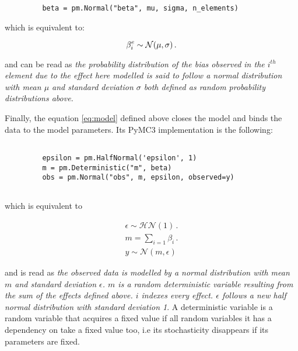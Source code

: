 \begin{verbatim}
         beta = pm.Normal("beta", mu, sigma, n_elements)  
\end{verbatim}

which is equivalent to:

\begin{equation}
\beta^e_i \sim \mathcal{N}(\mu, \sigma)\,.  \\
\end{equation}

and can be read as \textit{the probability distribution of the bias observed in the $i^{th}$ element due to the effect here modelled is said to follow a normal distribution with mean $\mu$ and standard deviation $\sigma$ both defined as random probability distributions above.}

Finally, the equation \ref{eq:model} defined above closes the model and binds the data to the model parameters. Its PyMC3 implementation is the following:

\begin{verbatim}
               
         epsilon = pm.HalfNormal('epsilon', 1)                
         m = pm.Deterministic("m", beta)
         obs = pm.Normal("obs", m, epsilon, observed=y)
      
\end{verbatim}

which is equivalent to

\begin{align}
\nonumber \epsilon \sim \mathcal{HN}(1) \,. \\ 
m = \sum_{i=1} \beta_i \,. \\ 
\nonumber y \sim \mathcal{N}(m, \epsilon)
\end{align}

and is read as \textit{the observed data is modelled by a normal distribution with mean $m$ and standard deviation $\epsilon$. $m$ is a random deterministic variable resulting from the sum of the effects defined above. $i$ indexes every effect. $\epsilon$ follows a new half normal distribution with standard deviation 1}. A deterministic variable is a random variable that acquires a fixed value if all random variables it has a dependency on take a fixed value too, i.e its stochasticity disappears if its parameters are fixed.


